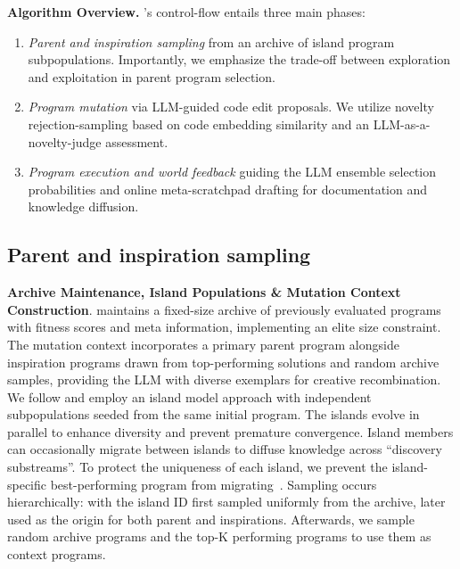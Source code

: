 \textbf{Algorithm Overview.} \ouralgo's control-flow entails three main phases: 
\begin{enumerate}
\item \textit{Parent and inspiration sampling} from an archive of island program subpopulations. Importantly, we emphasize the trade-off between exploration and exploitation in parent program selection.
\item \textit{Program mutation} via LLM-guided code edit proposals. We utilize novelty rejection-sampling based on code embedding similarity and an LLM-as-a-novelty-judge assessment.
\item \textit{Program execution and world feedback} guiding the LLM ensemble selection probabilities and online meta-scratchpad drafting for documentation and knowledge diffusion.
\end{enumerate}

\subsection{Parent and inspiration sampling}
\textbf{Archive Maintenance, Island Populations \& Mutation Context Construction}. \ouralgo maintains a fixed-size archive of previously evaluated programs with fitness scores and meta information, implementing an elite size constraint. The mutation context incorporates a primary parent program alongside inspiration programs drawn from top-performing solutions and random archive samples, providing the LLM with diverse exemplars for creative recombination. We follow \citet{romera2024mathematical,novikov2025alphaevolve} and employ an island model approach with independent subpopulations seeded from the same initial program. The islands evolve in parallel to enhance diversity and prevent premature convergence. Island members can occasionally migrate between islands to diffuse knowledge across ``discovery substreams''. To protect the uniqueness of each island, we prevent the island-specific best-performing program from migrating~\citep{tanese1989distributed, romera2024mathematical}. Sampling occurs hierarchically: with the island ID first sampled uniformly from the archive, later used as the origin for both parent and inspirations. Afterwards, we sample random archive programs and the top-K performing programs to use them as context programs.

